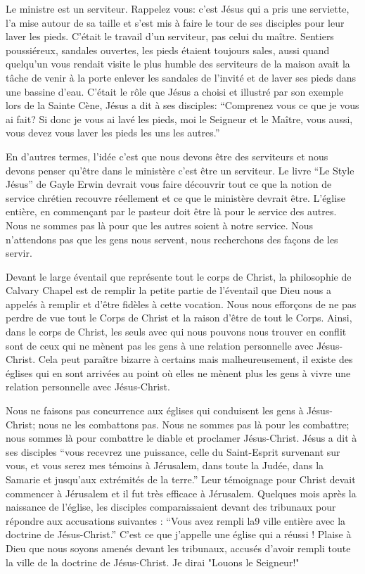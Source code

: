 Le ministre est un serviteur. Rappelez vous: c’est Jésus qui a pris une serviette, l'a mise autour de sa taille et s’est mis
à faire le tour de ses disciples pour leur laver les pieds. C’était le travail d’un serviteur, pas celui du maître. Sentiers
poussiéreux, sandales ouvertes, les pieds étaient toujours sales, aussi quand quelqu’un vous rendait visite le plus
humble des serviteurs de la maison avait la tâche de venir à la porte enlever les sandales de l’invité et de laver ses
pieds dans une bassine d’eau. C’était le rôle que Jésus a choisi et illustré par son exemple lors de la Sainte Cène,
Jésus a dit à ses disciples: “Comprenez vous ce que je vous ai fait? Si donc je vous ai lavé les pieds, moi le Seigneur
et le Maître, vous aussi, vous devez vous laver les pieds les uns les autres.”

En d’autres termes, l’idée c'est que nous devons être des serviteurs et nous devons penser qu'être dans le ministère
c'est être un serviteur. Le livre “Le Style Jésus” de Gayle Erwin devrait vous faire découvrir tout ce que la notion de
service chrétien recouvre réellement et ce que le ministère devrait être. L’église entière, en commençant par le
pasteur doit être là pour le service des autres. Nous ne sommes pas là pour que les autres soient à notre service.
Nous n’attendons pas que les gens nous servent, nous recherchons des façons de les servir.

Devant le large éventail que représente tout le corps de Christ, la philosophie de Calvary Chapel est de remplir la
petite partie de l’éventail que Dieu nous a appelés à remplir et d’être fidèles à cette vocation. Nous nous efforçons de
ne pas perdre de vue tout le Corps de Christ et la raison d'être de tout le Corps. Ainsi, dans le corps de Christ, les
seuls avec qui nous pouvons nous trouver en conflit sont de ceux qui ne mènent pas les gens à une relation
personnelle avec Jésus-Christ. Cela peut paraître bizarre à certains mais malheureusement, il existe des églises qui en
sont arrivées au point où elles ne mènent plus les gens à vivre une relation personnelle avec Jésus-Christ.

Nous ne faisons pas concurrence aux églises qui conduisent les gens à Jésus-Christ; nous ne les combattons pas.
Nous ne sommes pas là pour les combattre; nous sommes là pour combattre le diable et proclamer Jésus-Christ.
Jésus a dit à ses disciples “vous recevrez une puissance, celle du Saint-Esprit survenant sur vous, et vous serez mes
témoins à Jérusalem, dans toute la Judée, dans la Samarie et jusqu’aux extrémités de la terre.” Leur témoignage pour
Christ devait commencer à Jérusalem et il fut très efficace à Jérusalem. Quelques mois après la naissance de l’église,
les disciples comparaissaient devant des tribunaux pour répondre aux accusations suivantes : “Vous avez rempli la9
ville entière avec la doctrine de Jésus-Christ.” C’est ce que j’appelle une église qui a réussi ! Plaise à Dieu que nous
soyons amenés devant les tribunaux, accusés d’avoir rempli toute la ville de la doctrine de Jésus-Christ. Je dirai
"Louons le Seigneur!"

